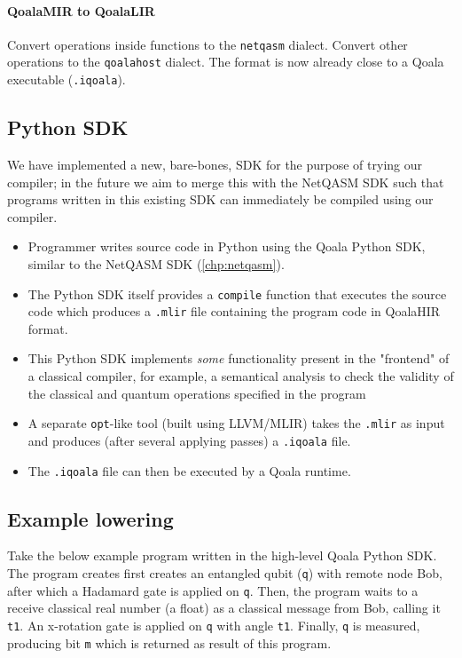 \paragraph{QoalaMIR to QoalaLIR}
Convert operations inside functions to the \texttt{netqasm} dialect.
Convert other operations to the \texttt{qoalahost} dialect.
The format is now already close to a Qoala executable (\texttt{.iqoala}).

\subsection{Python SDK}
We have implemented a new, bare-bones, SDK for the purpose of trying our compiler; in the future we aim to merge this with the NetQASM SDK such that programs written in this existing SDK can immediately be compiled using our compiler.

\begin{itemize}
\item Programmer writes source code in Python using the Qoala Python SDK, similar to the NetQASM SDK (\cref{chp:netqasm}).
\item The Python SDK itself provides a \texttt{compile} function that executes the source code
  which produces a \texttt{.mlir} file containing the program code in QoalaHIR format.
\item This Python SDK implements \textit{some} functionality present in the "frontend" of a classical
  compiler, for example, a semantical analysis to check the validity of the classical and
  quantum operations specified in the program 
\item A separate \texttt{opt}-like tool (built using LLVM/MLIR) takes the \texttt{.mlir} as input and produces
  (after several applying passes) a \texttt{.iqoala} file.
\item The \texttt{.iqoala} file can then be executed by a Qoala runtime.
\end{itemize}


\subsection{Example lowering}

Take the below example program written in the high-level Qoala Python SDK.
The program creates first creates an entangled qubit (\texttt{q}) with remote node Bob, after which a Hadamard gate is applied on \texttt{q}.
Then, the program waits to a receive classical real number (a float) as a classical message from Bob, calling it \texttt{t1}.
An x-rotation gate is applied on \texttt{q} with angle \texttt{t1}.
Finally, \texttt{q} is measured, producing bit \texttt{m} which is returned as result of this program.

